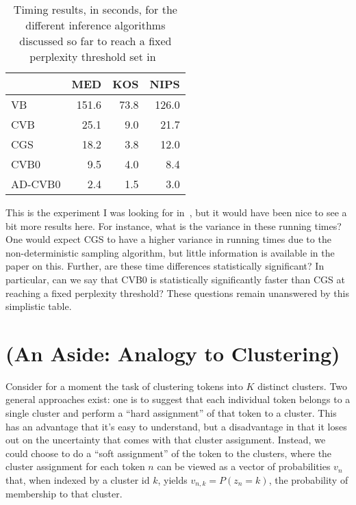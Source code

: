 \documentclass[11pt]{article}
\begin{document}
\begin{table}[h]
  \begin{center}
    \begin{tabular}{l|r|r|r}
      & \textbf{MED} & \textbf{KOS} & \textbf{NIPS}\\\hline
      VB & 151.6 & 73.8 & 126.0\\
      CVB & 25.1 & 9.0 & 21.7\\
      CGS & 18.2 & 3.8 & 12.0\\
      CVB0 & 9.5 & 4.0 & 8.4\\
      AD-CVB0 & 2.4 & 1.5 & 3.0\\
    \end{tabular}
  \end{center}
  \caption{Timing results, in seconds, for the different inference algorithms discussed
    so far to reach a fixed perplexity threshold set
    in~\cite{Asuncion:2009:onsmoothing}}
  \label{table:cvb0time}
\end{table}

This is the experiment I was looking for in~\cite{Teh:2007:CVB}, but it
would have been nice to see a bit more results here. For instance, what is
the variance in these running times? One would expect CGS to have a higher
variance in running times due to the non-deterministic sampling algorithm,
but little information is available in the paper on this. Further, are
these time differences statistically significant? In particular, can we say
that CVB0 is statistically significantly faster than CGS at reaching a
fixed perplexity threshold? These questions remain unanswered by this
simplistic table.

\section{(An Aside: Analogy to Clustering)}

Consider for a moment the task of clustering tokens into $K$ distinct
clusters. Two general approaches exist: one is to suggest that each
individual token belongs to a single cluster and perform a ``hard
assignment'' of that token to a cluster. This has an advantage that it's
easy to understand, but a disadvantage in that it loses out on the
uncertainty that comes with that cluster assignment. Instead, we could
choose to do a ``soft assignment'' of the token to the clusters, where the
cluster assignment for each token $n$ can be viewed as a vector of
probabilities $v_n$ that, when indexed by a cluster id $k$, yields
$v_{n,k} = P(z_n = k)$, the probability of membership to that cluster.
\end{document}
